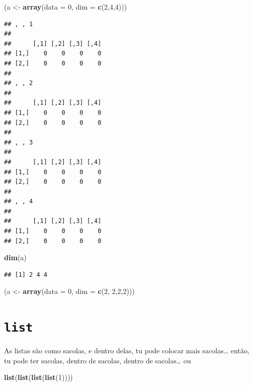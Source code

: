 \documentclass[]{book}
\newenvironment{Shaded}{\begin{snugshade}}{\end{snugshade}}
\newcommand{\KeywordTok}[1]{\textcolor[rgb]{0.13,0.29,0.53}{\textbf{#1}}}
\newcommand{\DataTypeTok}[1]{\textcolor[rgb]{0.13,0.29,0.53}{#1}}
\newcommand{\DecValTok}[1]{\textcolor[rgb]{0.00,0.00,0.81}{#1}}
\newcommand{\StringTok}[1]{\textcolor[rgb]{0.31,0.60,0.02}{#1}}
\newcommand{\NormalTok}[1]{#1}
\begin{document}
\begin{Shaded}
\begin{Highlighting}[]
\NormalTok{(a <-}\StringTok{ }\KeywordTok{array}\NormalTok{(}\DataTypeTok{data =} \DecValTok{0}\NormalTok{, }\DataTypeTok{dim =} \KeywordTok{c}\NormalTok{(}\DecValTok{2}\NormalTok{,}\DecValTok{4}\NormalTok{,}\DecValTok{4}\NormalTok{)))}
\end{Highlighting}
\end{Shaded}

\begin{verbatim}
## , , 1
## 
##      [,1] [,2] [,3] [,4]
## [1,]    0    0    0    0
## [2,]    0    0    0    0
## 
## , , 2
## 
##      [,1] [,2] [,3] [,4]
## [1,]    0    0    0    0
## [2,]    0    0    0    0
## 
## , , 3
## 
##      [,1] [,2] [,3] [,4]
## [1,]    0    0    0    0
## [2,]    0    0    0    0
## 
## , , 4
## 
##      [,1] [,2] [,3] [,4]
## [1,]    0    0    0    0
## [2,]    0    0    0    0
\end{verbatim}

\begin{Shaded}
\begin{Highlighting}[]
\KeywordTok{dim}\NormalTok{(a)}
\end{Highlighting}
\end{Shaded}

\begin{verbatim}
## [1] 2 4 4
\end{verbatim}

\begin{Shaded}
\begin{Highlighting}[]
\NormalTok{(a <-}\StringTok{ }\KeywordTok{array}\NormalTok{(}\DataTypeTok{data =} \DecValTok{0}\NormalTok{, }\DataTypeTok{dim =} \KeywordTok{c}\NormalTok{(}\DecValTok{2}\NormalTok{, }\DecValTok{2}\NormalTok{,}\DecValTok{2}\NormalTok{,}\DecValTok{2}\NormalTok{)))}
\end{Highlighting}
\end{Shaded}

\section{\texorpdfstring{\texttt{list}}{list}}\label{list}

As listas são como sacolas, e dentro delas, tu pode colocar mais
sacolas\ldots{} então, tu pode ter sacolas, dentro de sacolas, dentro de
sacolas\ldots{} ou

\begin{Shaded}
\begin{Highlighting}[]
\KeywordTok{list}\NormalTok{(}\KeywordTok{list}\NormalTok{(}\KeywordTok{list}\NormalTok{(}\KeywordTok{list}\NormalTok{(}\DecValTok{1}\NormalTok{))))}
\end{Highlighting}
\end{Shaded}
\end{document}
